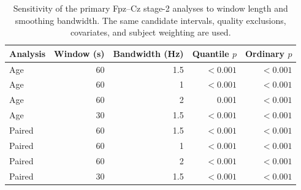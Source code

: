 \begin{table}[htbp]
\centering
\caption{Sensitivity of the primary Fpz--Cz stage-2 analyses to window length and smoothing bandwidth. The same candidate intervals, quality exclusions, covariates, and subject weighting are used.}\label{tab:eeg-sensitivity}
\small
\begin{tabular}{lrrr r}
\toprule
Analysis & Window (s) & Bandwidth (Hz) & Quantile $p$ & Ordinary $p$\\
\midrule
Age & 60 & 1.5 & $<0.001$ & $<0.001$ \\
Age & 60 & 1 & $<0.001$ & $<0.001$ \\
Age & 60 & 2 & 0.001 & $<0.001$ \\
Age & 30 & 1.5 & $<0.001$ & $<0.001$ \\
Paired & 60 & 1.5 & $<0.001$ & $<0.001$ \\
Paired & 60 & 1 & $<0.001$ & $<0.001$ \\
Paired & 60 & 2 & $<0.001$ & $<0.001$ \\
Paired & 30 & 1.5 & $<0.001$ & $<0.001$ \\
\bottomrule
\end{tabular}
\end{table}
